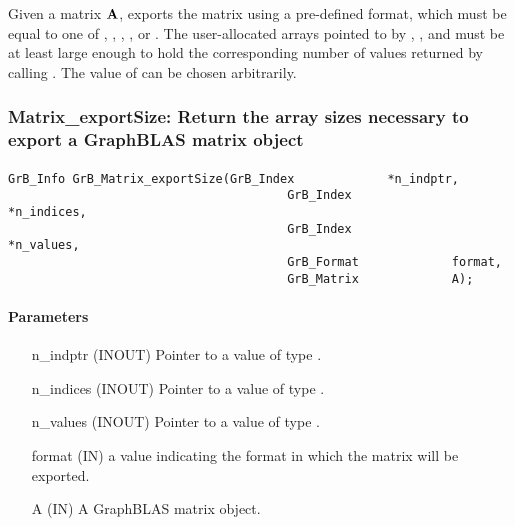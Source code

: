 Given a matrix ${\bf A}$, exports the matrix using a pre-defined
 format, which must be equal to one of ,
, , ,
or .
The user-allocated arrays
pointed to by , , and  must be at least
large enough to hold the corresponding number of values returned by calling
.  The value of  can be chosen arbitrarily.


\subsubsection{{\sf Matrix\_exportSize}: Return the array sizes necessary to export a GraphBLAS matrix object}
\label{Sec:Matrix_exportSize}

\paragraph{\syntax}

\begin{Verbatim}[samepage=true]    
        GrB_Info GrB_Matrix_exportSize(GrB_Index             *n_indptr,
                                       GrB_Index             *n_indices,
                                       GrB_Index             *n_values,
                                       GrB_Format             format,
                                       GrB_Matrix             A);
\end{Verbatim}

\paragraph{Parameters}

\begin{itemize}[leftmargin=1.1in]
    \item[{\sf n\_indptr}] ({\sf INOUT}) Pointer to a value of type .
    \item[{\sf n\_indices}] ({\sf INOUT}) Pointer to a value of type .
    \item[{\sf n\_values}] ({\sf INOUT}) Pointer to a value of type .
    \item[{\sf format}] ({\sf IN}) a value indicating the format in which the matrix will be exported.
    \item[{\sf A}]      ({\sf IN}) A GraphBLAS matrix object.
\end{itemize}

